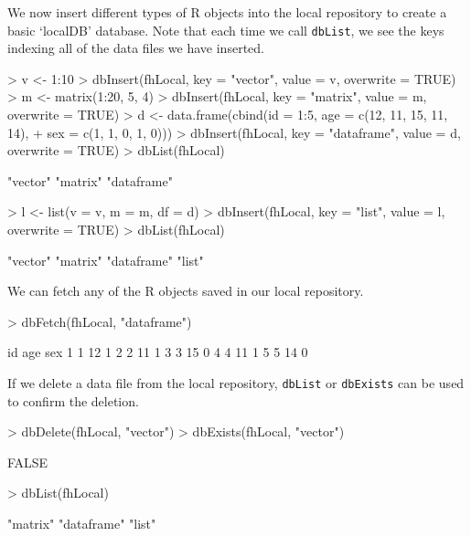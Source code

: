 \documentclass{article}
\newcommand{\code}{\texttt}
\begin{document}
\noindent We now insert different types of R objects into the local repository to 
create a basic `localDB' database. Note that each time we call 
\code{dbList}, we see the keys indexing all of the data files we have inserted.

\begin{Schunk}
\begin{Sinput}
> v <- 1:10
> dbInsert(fhLocal, key = "vector", value = v, overwrite = TRUE)
> m <- matrix(1:20, 5, 4)
> dbInsert(fhLocal, key = "matrix", value = m, overwrite = TRUE)
> d <- data.frame(cbind(id = 1:5, age = c(12, 11, 15, 11, 14), 
+     sex = c(1, 1, 0, 1, 0)))
> dbInsert(fhLocal, key = "dataframe", value = d, overwrite = TRUE)
> dbList(fhLocal)
\end{Sinput}
\begin{Soutput}
[1] "vector"    "matrix"    "dataframe"
\end{Soutput}
\begin{Sinput}
> l <- list(v = v, m = m, df = d)
> dbInsert(fhLocal, key = "list", value = l, overwrite = TRUE)
> dbList(fhLocal)
\end{Sinput}
\begin{Soutput}
[1] "vector"    "matrix"    "dataframe" "list"     
\end{Soutput}
\end{Schunk}

\noindent We can fetch any of the R objects saved in our local repository.
\begin{Schunk}
\begin{Sinput}
> dbFetch(fhLocal, "dataframe")
\end{Sinput}
\begin{Soutput}
  id age sex
1  1  12   1
2  2  11   1
3  3  15   0
4  4  11   1
5  5  14   0
\end{Soutput}
\end{Schunk}

\noindent If we delete a data file from the local repository, \code{dbList} or
\code{dbExists} can be used to confirm the deletion.
\begin{Schunk}
\begin{Sinput}
> dbDelete(fhLocal, "vector")
> dbExists(fhLocal, "vector")
\end{Sinput}
\begin{Soutput}
[1] FALSE
\end{Soutput}
\begin{Sinput}
> dbList(fhLocal)
\end{Sinput}
\begin{Soutput}
[1] "matrix"    "dataframe" "list"     
\end{Soutput}
\end{Schunk}
\end{document}
